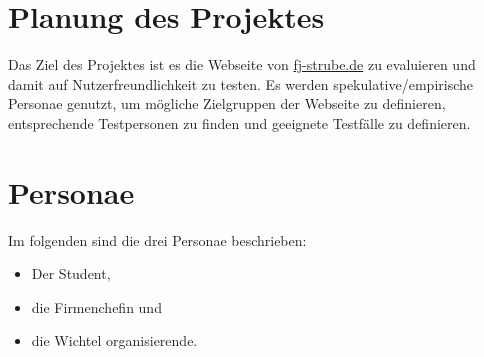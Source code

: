 \section{Planung des Projektes}
Das Ziel des Projektes ist es die Webseite von \url{fj-strube.de} zu evaluieren und damit auf Nutzerfreundlichkeit zu testen.
Es werden spekulative/empirische Personae genutzt, um mögliche Zielgruppen der Webseite zu definieren, entsprechende Testpersonen zu finden und geeignete Testfälle zu definieren.

\section{Personae}
Im folgenden sind die drei Personae beschrieben:
\begin{itemize}
\item Der Student,
\item die Firmenchefin und
\item die Wichtel organisierende.
\end{itemize}

\clearpage
